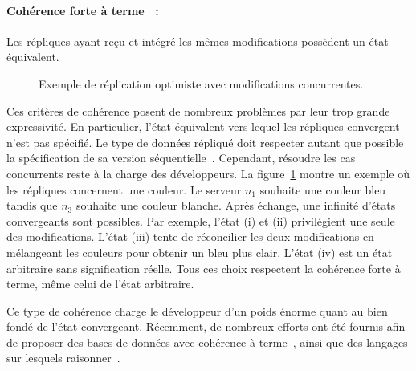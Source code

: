 \paragraph{Cohérence forte à terme~\cite{shapiro2011conflict} :} Les répliques
ayant reçu et intégré les mêmes modifications possèdent un état équivalent.


\begin{figure}
  \centering
  \hspace{10pt}
  \caption[Convergence en réplication optimiste]
  {\label{repl:fig:optimisticexample} Exemple de réplication optimiste avec
    modifications concurrentes.}
\end{figure}


Ces critères de cohérence posent de nombreux problèmes par leur trop grande
expressivité. En particulier, l'état équivalent vers lequel les répliques
convergent n'est pas spécifié. Le type de données répliqué doit respecter autant
que possible la spécification de sa version
séquentielle~\cite{bieniusa2012brief}. Cependant, résoudre les cas concurrents
reste à la charge des développeurs. La figure~\ref{repl:fig:optimisticexample}
montre un exemple où les répliques concernent une couleur. Le serveur $n_1$
souhaite une couleur bleu tandis que $n_3$ souhaite une couleur blanche. Après
échange, une infinité d'états convergeants sont possibles. Par exemple, l'état
(i) et (ii) privilégient une seule des modifications. L'état (iii) tente de
réconcilier les deux modifications en mélangeant les couleurs pour obtenir un
bleu plus clair. L'état (iv) est un état arbitraire sans signification
réelle. Tous ces choix respectent la cohérence forte à terme, même celui de
l'état arbitraire.

Ce type de cohérence charge le développeur d'un poids énorme quant au bien fondé
de l'état convergeant.  Récemment, de nombreux efforts ont été fournis afin de
proposer des bases de données avec cohérence à terme~\cite{dynamo, riak,
  cassandra, mongodb}, ainsi que des langages sur lesquels
raisonner~\cite{conway2012logic, meiklejohn2015lasp}.


